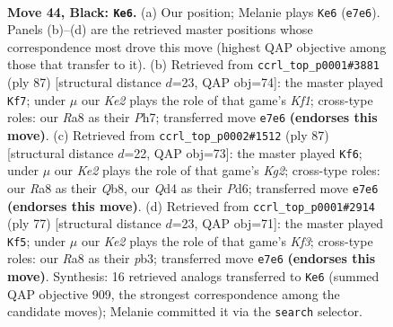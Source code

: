 \documentclass[11pt]{article}
\begin{document}
\clearpage

\begin{figure}[p]\centering
\begin{subfigure}{0.46\textwidth}\centering
\resizebox{\linewidth}{!}{%
\newchessgame
\chessboard[
  setfen={r7/4k2Q/5p2/3p4/3q1P2/p5P1/P5KP/8 b - - 8 44},
  showmover=false,
  pgfstyle=straightmove, color=movearrow, markmove={e7-e6}
]}
\caption{}
\end{subfigure}\hfill
\begin{subfigure}{0.46\textwidth}\centering
\resizebox{\linewidth}{!}{%
\newchessgame
\chessboard[
  setfen={2Q2k2/4p2p/5p2/8/6Pq/5P2/5PK1/8 b - - 8 44},
  showmover=false,
  pgfstyle=straightmove, color=movearrow, markmove={f8-f7}
]}
\caption{}
\end{subfigure}
\\[4pt]
\begin{subfigure}{0.46\textwidth}\centering
\resizebox{\linewidth}{!}{%
\newchessgame
\chessboard[
  setfen={1q6/3Q2k1/3p2p1/p2Pp3/P7/6P1/5PK1/8 b - - 7 44},
  showmover=false,
  pgfstyle=straightmove, color=movearrow, markmove={g7-f6}
]}
\caption{}
\end{subfigure}\hfill
\begin{subfigure}{0.46\textwidth}\centering
\resizebox{\linewidth}{!}{%
\newchessgame
\chessboard[
  setfen={5q2/5p2/2Q2k1p/4p3/1p6/1P5P/P5P1/7K b - - 5 39},
  showmover=false,
  pgfstyle=straightmove, color=movearrow, markmove={f6-f5}
]}
\caption{}
\end{subfigure}
\caption{\textbf{Move 44, Black: \texttt{Ke6}.} (a) Our position; Melanie plays \texttt{Ke6} (\texttt{e7e6}). Panels (b)--(d) are the retrieved master positions whose correspondence most drove this move (highest QAP objective among those that transfer to it). (b) Retrieved from \texttt{ccrl\_top\_p0001\#3881} (ply 87) [structural distance $d$=23, QAP obj=74]: the master played \texttt{Kf7}; under $\mu$ our \emph{Ke2} plays the role of that game's \emph{Kf1}; cross-type roles: our \emph{R}a8 as their \emph{P}h7; transferred move \texttt{e7e6} \textbf{(endorses this move)}. (c) Retrieved from \texttt{ccrl\_top\_p0002\#1512} (ply 87) [structural distance $d$=22, QAP obj=73]: the master played \texttt{Kf6}; under $\mu$ our \emph{Ke2} plays the role of that game's \emph{Kg2}; cross-type roles: our \emph{R}a8 as their \emph{Q}b8, our \emph{Q}d4 as their \emph{P}d6; transferred move \texttt{e7e6} \textbf{(endorses this move)}. (d) Retrieved from \texttt{ccrl\_top\_p0001\#2914} (ply 77) [structural distance $d$=23, QAP obj=71]: the master played \texttt{Kf5}; under $\mu$ our \emph{Ke2} plays the role of that game's \emph{Kf3}; cross-type roles: our \emph{R}a8 as their \emph{p}b3; transferred move \texttt{e7e6} \textbf{(endorses this move)}. Synthesis: 16 retrieved analogs transferred to \texttt{Ke6} (summed QAP objective 909, the strongest correspondence among the candidate moves); Melanie committed it via the \texttt{search} selector.}
\label{fig:thought-m87}
\end{figure}
\end{document}
